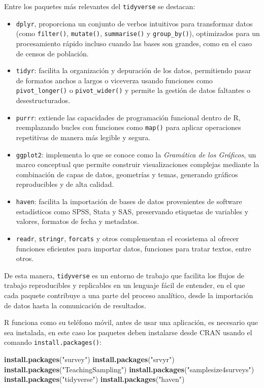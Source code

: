 \documentclass[
  spanish,
  12pt,
]{book}
\newenvironment{Shaded}{\begin{snugshade}}{\end{snugshade}}
\newcommand{\FunctionTok}[1]{\textcolor[rgb]{0.13,0.29,0.53}{\textbf{#1}}}
\newcommand{\NormalTok}[1]{#1}
\newcommand{\StringTok}[1]{\textcolor[rgb]{0.31,0.60,0.02}{#1}}
\begin{document}
Entre los paquetes más relevantes del \texttt{tidyverse} se destacan:

\begin{itemize}
\item
  \texttt{dplyr}, proporciona un conjunto de verbos intuitivos para transformar datos (como \texttt{filter()}, \texttt{mutate()}, \texttt{summarise()} y \texttt{group\_by()}), optimizados para un procesamiento rápido incluso cuando las bases son grandes, como en el caso de censos de población.
\item
  \texttt{tidyr}: facilita la organización y depuración de los datos, permitiendo pasar de formatos anchos a largos o viceverza usando funciones como \texttt{pivot\_longer()} o \texttt{pivot\_wider()} y permite la gestión de datos faltantes o desestructurados.
\item
  \texttt{purrr}: extiende las capacidades de programación funcional dentro de R, reemplazando bucles con funciones como \texttt{map()} para aplicar operaciones repetitivas de manera más legible y segura.
\item
  \texttt{ggplot2}: implementa lo que se conoce como la \emph{Gramática de los Gráficos}, un marco conceptual que permite construir visualizaciones complejas mediante la combinación de capas de datos, geometrías y temas, generando gráficos reproducibles y de alta calidad.
\item
  \texttt{haven}: facilita la importación de bases de datos provenientes de software estadísticos como SPSS, Stata y SAS, preservando etiquetas de variables y valores, formatos de fecha y metadatos.
\item
  \texttt{readr}, \texttt{stringr}, \texttt{forcats} y otros complementan el ecosistema al ofrecer funciones eficientes para importar datos, funciones para tratar textos, entre otros.
\end{itemize}

De esta manera, \texttt{tidyverse} es un entorno de trabajo que facilita los flujos de trabajo reproducibles y replicables en un lenguaje fácil de entender, en el que cada paquete contribuye a una parte del proceso analítico, desde la importación de datos hasta la comunicación de resultados.

R funciona como su teléfono móvil, antes de usar una aplicación, es necesario que sea instalada, en este caso los paquetes deben instalarse desde CRAN usando el comando \texttt{install.packages()}:

\begin{Shaded}
\begin{Highlighting}[]
\FunctionTok{install.packages}\NormalTok{(}\StringTok{"survey"}\NormalTok{)}
\FunctionTok{install.packages}\NormalTok{(}\StringTok{"srvyr"}\NormalTok{)}
\FunctionTok{install.packages}\NormalTok{(}\StringTok{"TeachingSampling"}\NormalTok{)}
\FunctionTok{install.packages}\NormalTok{(}\StringTok{"samplesize4surveys"}\NormalTok{)}
\FunctionTok{install.packages}\NormalTok{(}\StringTok{"tidyverse"}\NormalTok{)}
\FunctionTok{install.packages}\NormalTok{(}\StringTok{"haven"}\NormalTok{)}
\end{Highlighting}
\end{Shaded}
\end{document}
